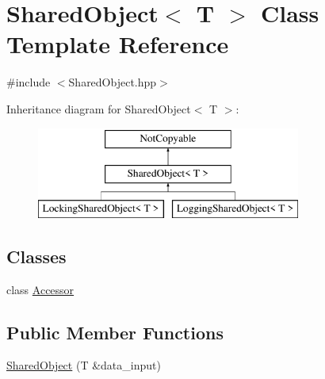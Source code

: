 \hypertarget{class_shared_object}{}\section{Shared\+Object$<$ T $>$ Class Template Reference}
\label{class_shared_object}


{\ttfamily \#include $<$Shared\+Object.\+hpp$>$}

Inheritance diagram for Shared\+Object$<$ T $>$\+:\begin{figure}[H]
\begin{center}
\leavevmode
\includegraphics[height=3.000000cm]{class_shared_object}
\end{center}
\end{figure}
\subsection*{Classes}
\begin{DoxyCompactItemize}
\item 
class \hyperlink{class_shared_object_1_1_accessor}{Accessor}
\end{DoxyCompactItemize}
\subsection*{Public Member Functions}
\begin{DoxyCompactItemize}
\item 
\hyperlink{class_shared_object_a15d662bd0c54b318c9c54a46b7a85067}{Shared\+Object} (T \&data\+\_\+input)
\end{DoxyCompactItemize}
